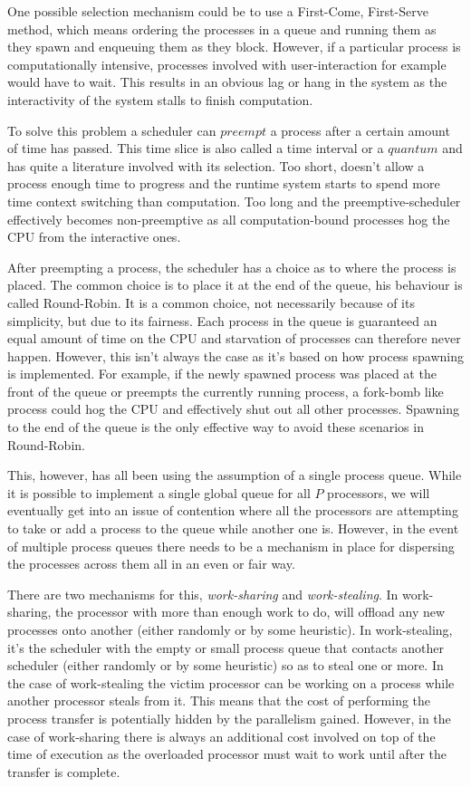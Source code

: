 One possible selection mechanism could be to use a First-Come, First-Serve method, 
which means ordering 
the processes in a queue and running them as they spawn and enqueuing them as they 
block. However, if a particular
process is computationally intensive, processes involved with user-interaction 
for example would have to wait. This results in an obvious lag or hang in the 
system as the interactivity of the system stalls to finish computation.

To solve this problem a scheduler can $preempt$ a process after a certain amount
of time has passed. This time slice is also called a time interval or a $quantum$
and has quite a literature involved with its selection. 
Too short, doesn't allow a process enough time to progress and the runtime system
starts to spend more time context switching than computation. Too long and the
preemptive-scheduler effectively becomes non-preemptive as all computation-bound
processes hog the CPU from the interactive ones.

After preempting a process, the scheduler has a choice as to where the process
is placed. The common choice is to place it at the end of the queue, his 
behaviour is called Round-Robin. It is a common choice, not necessarily because
of its simplicity, but due to its fairness. Each process in the queue is 
guaranteed an equal amount of time on the CPU and starvation of processes can 
therefore never happen. However, this isn't always the case as it's based on how
process spawning is implemented. For example, if the newly spawned process
was placed at the front of the queue or preempts the currently running process,
a fork-bomb like process could hog the CPU and effectively shut out all other 
processes. Spawning to the end of the queue is the only effective way to avoid
these scenarios in Round-Robin.

This, however, has all been using the assumption of a single process queue. While
it is possible to implement a single global queue for all $P$ processors, we will
eventually get into an issue of contention where all the processors are 
attempting to take or add a process to the queue while another one is. However,
in the event of multiple process queues there needs to be a mechanism in place 
for dispersing the processes across them all in an even or fair way.

There are two mechanisms for this, \emph{work-sharing} and 
\emph{work-stealing}. In work-sharing, the processor with more than enough work
to do, will offload any new processes onto another (either randomly or by some
heuristic). In work-stealing, it's the scheduler with the empty or small process 
queue that contacts another scheduler (either 
randomly or by some heuristic) so as to steal one or more. In the case of 
work-stealing the victim processor can be working on a process while another
processor steals from it. This means that the cost of performing the process
transfer is potentially hidden by the parallelism gained. However, in the case 
of work-sharing there is always an additional cost involved on top of the time
of execution as the overloaded processor must wait to work until after the 
transfer is complete.

